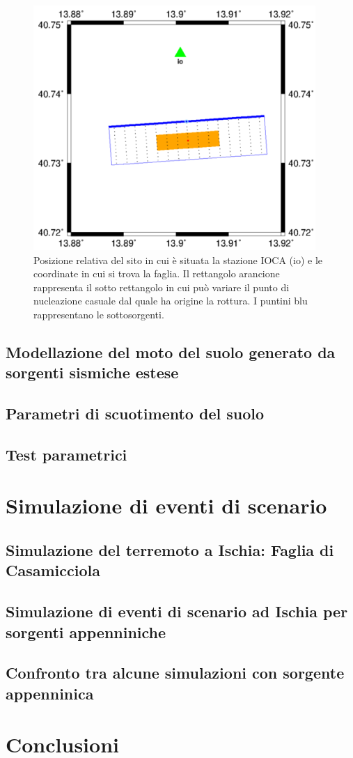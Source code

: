 \documentclass[a4paper,12pt,titlepage]{article}
\begin{document}
\begin{figure}[htbp]
 \centering
 \includegraphics[width=.5\linewidth]{Img/Positions.png}
 \caption{Posizione relativa del sito in cui è situata la stazione IOCA (io) e le coordinate in cui si trova la faglia. Il rettangolo arancione rappresenta il sotto rettangolo in cui può variare il punto di nucleazione casuale dal quale ha origine la rottura. I puntini blu rappresentano le sottosorgenti.}
 \label{fig:Positions}
\end{figure}





\subsection{Modellazione del moto del suolo generato da sorgenti sismiche
estese}
\subsection{Parametri di scuotimento del suolo}
\subsection{Test parametrici}

\section{Simulazione di eventi di scenario}
\subsection{Simulazione del terremoto a Ischia: Faglia di Casamicciola}
\subsection{ Simulazione di eventi di scenario ad Ischia per sorgenti appenniniche}
\subsection{Confronto tra alcune simulazioni con sorgente appenninica}

\section*{Conclusioni}
\end{document}
